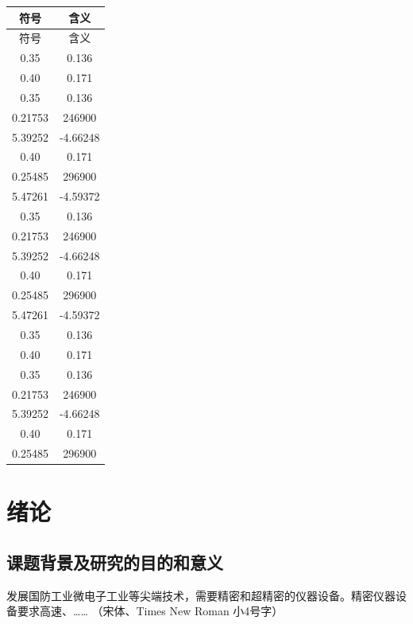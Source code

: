 \documentclass[a4paper, twoside, openany]{NCEPUMaster}
\begin{document}
\begin{longtable}{ C{0.4} C{0.6}}
\toprule[1.5pt]
符号 & 含义 \\  %
\midrule[1pt]
\endfirsthead

\toprule[1.5pt]
符号 & 含义 \\ %
\midrule[1pt]
\endhead

\bottomrule[1.5pt]
\endfoot

0.35 & 0.136 \\  
0.40 & 0.171 \\
0.35 & 0.136 \\
0.21753 & 246900 \\
5.39252 & -4.66248 \\
0.40 & 0.171 \\
0.25485 & 296900 \\
5.47261 & -4.59372 \\
0.35 & 0.136 \\
0.21753 & 246900 \\
5.39252 & -4.66248 \\
0.40 & 0.171 \\ 
0.25485 & 296900 \\
5.47261 & -4.59372 \\
0.35 & 0.136 \\  
0.40 & 0.171 \\
0.35 & 0.136 \\
0.21753 & 246900 \\
5.39252 & -4.66248 \\
0.40 & 0.171 \\
0.25485 & 296900 \\
 
\end{longtable}


\clearpage
\setcounter{page}{1} %

\chapter{绪论} %

\section{课题背景及研究的目的和意义} %

发展国防工业微电子工业等尖端技术，需要精密和超精密的仪器设备。精密仪器设备要求高速、…… （宋体、Times New Roman 小4号字）
\end{document}
